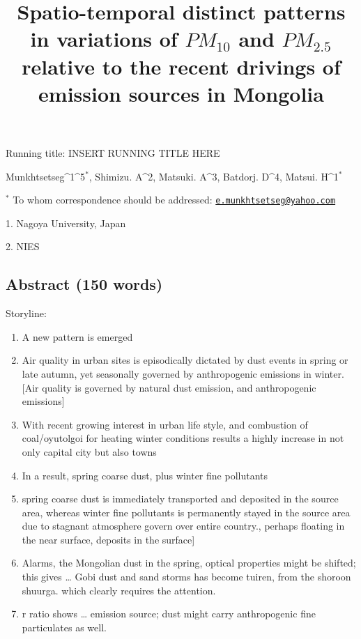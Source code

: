 \documentclass[
  11pt,
]{article}
\title{\textbf{Spatio-temporal distinct patterns in variations of
\(PM_{10}\) and \(PM_{2.5}\) relative to the recent drivings of emission
sources in Mongolia}}
\author{}
\date{\vspace{-2.5em}}
\providecommand{\tightlist}{%
  \setlength{\itemsep}{0pt}\setlength{\parskip}{0pt}}
\begin{document}
\maketitle

\vspace{35mm}

Running title: INSERT RUNNING TITLE HERE

\vspace{35mm}

Munkhtsetseg\^{}1\^{}5\(^*\), Shimizu. A\^{}2, Matsuki. A\^{}3, Batdorj.
D\^{}4, Matsui. H\^{}1\(^*\)

\vspace{40mm}

\(^*\) To whom correspondence should be addressed:
\href{mailto:e.munkhtsetseg@yahoo.com}{\nolinkurl{e.munkhtsetseg@yahoo.com}}

1. Nagoya University, Japan

2. NIES

\newpage
\linenumbers

\subsection{Abstract (150 words)}\label{abstract-150-words}

Storyline:

\begin{enumerate}
\def\labelenumi{\arabic{enumi}.}
\tightlist
\item
  A new pattern is emerged
\item
  Air quality in urban sites is episodically dictated by dust events in
  spring or late autumn, yet seasonally governed by anthropogenic
  emissions in winter. {[}Air quality is governed by natural dust
  emission, and anthropogenic emissions{]}
\item
  With recent growing interest in urban life style, and combustion of
  coal/oyutolgoi for heating winter conditions results a highly increase
  in not only capital city but also towns
\item
  In a result, spring coarse dust, plus winter fine pollutants
\item
  spring coarse dust is immediately transported and deposited in the
  source area, whereas winter fine pollutants is permanently stayed in
  the source area due to stagnant atmosphere govern over entire
  country., perhaps floating in the near surface, deposits in the
  surface{]}
\item
  Alarms, the Mongolian dust in the spring, optical properties might be
  shifted; this gives \ldots{} Gobi dust and sand storms has become
  tuiren, from the shoroon shuurga. which clearly requires the
  attention.
\item
  r ratio shows \ldots{} emission source; dust might carry anthropogenic
  fine particulates as well. \newpage
\end{enumerate}
\end{document}
